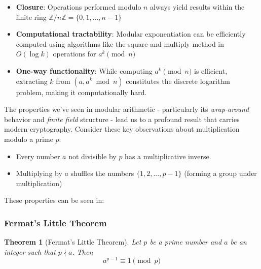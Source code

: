 \documentclass[11pt,a4paper]{article}
\newtheorem{theorem}{Theorem}[section]
\numberwithin{equation}{section}
\begin{document}
\begin{itemize}
    \item \textbf{Closure}: Operations performed modulo $n$ always yield results within the finite ring $\mathbb{Z}/n\mathbb{Z} = \{0,1,\ldots,n-1\}$
    \item \textbf{Computational tractability}: Modular exponentiation can be efficiently computed using algorithms like the square-and-multiply method in $O(\log k)$ operations for $a^k \pmod{n}$
    \item \textbf{One-way functionality}: While computing $a^k \pmod{n}$ is efficient, extracting $k$ from $(a, a^k \bmod n)$ constitutes the discrete logarithm problem, making it computationally hard.
\end{itemize}

\newpage

\noindent The properties we've seen in modular arithmetic - particularly its \textit{wrap-around} behavior and \textit{finite field} structure - lead us to a profound result that carries modern cryptography. Consider these key observations about multiplication modulo a prime $p$:

\begin{itemize}
    \item Every number $a$ not divisible by $p$ has a multiplicative inverse.
    \item Multiplying by $a$ shuffles the numbers $\{1,2,...,p-1\}$ (forming a group under multiplication)
\end{itemize}
These properties can be seen in:

\subsubsection{Fermat's Little Theorem}

\begin{theorem}[Fermat's Little Theorem]
Let $p$ be a prime number and $a$ be an integer such that $p \nmid a$. Then
\begin{equation}\label{eq:fermat}
a^{p-1} \equiv 1 \pmod{p}
\end{equation}
\end{theorem}
\end{document}
